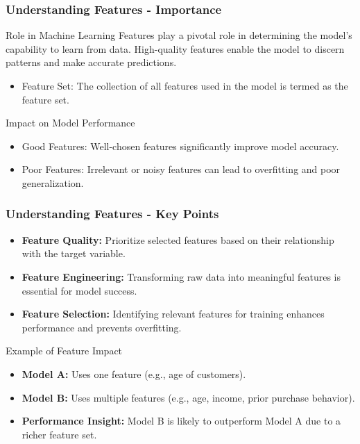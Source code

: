 \documentclass[aspectratio=169]{beamer}
\begin{document}
\begin{frame}[fragile]
    \frametitle{Understanding Features - Importance}
    \begin{block}{Role in Machine Learning}
        Features play a pivotal role in determining the model's capability to learn from data. High-quality features enable the model to discern patterns and make accurate predictions.
    \end{block}

    \begin{itemize}
        \item Feature Set: The collection of all features used in the model is termed as the feature set.
    \end{itemize}

    \begin{block}{Impact on Model Performance}
        \begin{itemize}
            \item Good Features: Well-chosen features significantly improve model accuracy.
            \item Poor Features: Irrelevant or noisy features can lead to overfitting and poor generalization.
        \end{itemize}
    \end{block}
\end{frame}

\begin{frame}[fragile]
    \frametitle{Understanding Features - Key Points}
    \begin{itemize}
        \item \textbf{Feature Quality:} Prioritize selected features based on their relationship with the target variable.
        \item \textbf{Feature Engineering:} Transforming raw data into meaningful features is essential for model success.
        \item \textbf{Feature Selection:} Identifying relevant features for training enhances performance and prevents overfitting.
    \end{itemize}

    \begin{block}{Example of Feature Impact}
        \begin{itemize}
            \item \textbf{Model A:} Uses one feature (e.g., age of customers).
            \item \textbf{Model B:} Uses multiple features (e.g., age, income, prior purchase behavior).
            \item \textbf{Performance Insight:} Model B is likely to outperform Model A due to a richer feature set.
        \end{itemize}
    \end{block}
\end{frame}
\end{document}
